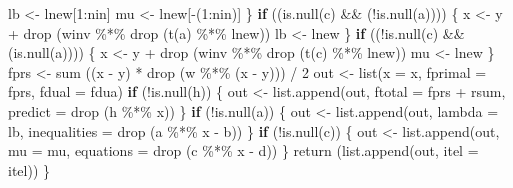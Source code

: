 \documentclass[
  12pt,
]{book}
\newenvironment{Shaded}{\begin{snugshade}}{\end{snugshade}}
\newcommand{\AttributeTok}[1]{\textcolor[rgb]{0.77,0.63,0.00}{#1}}
\newcommand{\ControlFlowTok}[1]{\textcolor[rgb]{0.13,0.29,0.53}{\textbf{#1}}}
\newcommand{\DecValTok}[1]{\textcolor[rgb]{0.00,0.00,0.81}{#1}}
\newcommand{\FunctionTok}[1]{\textcolor[rgb]{0.00,0.00,0.00}{#1}}
\newcommand{\NormalTok}[1]{#1}
\newcommand{\OtherTok}[1]{\textcolor[rgb]{0.56,0.35,0.01}{#1}}
\newcommand{\SpecialCharTok}[1]{\textcolor[rgb]{0.00,0.00,0.00}{#1}}
\theoremstyle{definition}
\theoremstyle{definition}
\theoremstyle{definition}
\theoremstyle{definition}
\theoremstyle{remark}
\begin{document}
\begin{Shaded}
\begin{Highlighting}[]
\NormalTok{      lb }\OtherTok{\textless{}{-}}\NormalTok{ lnew[}\DecValTok{1}\SpecialCharTok{:}\NormalTok{nin]}
\NormalTok{      mu }\OtherTok{\textless{}{-}}\NormalTok{ lnew[}\SpecialCharTok{{-}}\NormalTok{(}\DecValTok{1}\SpecialCharTok{:}\NormalTok{nin)]}
\NormalTok{    \}}
    \ControlFlowTok{if}\NormalTok{ ((}\FunctionTok{is.null}\NormalTok{(c) }\SpecialCharTok{\&\&}\NormalTok{ (}\SpecialCharTok{!}\FunctionTok{is.null}\NormalTok{(a)))) \{}
\NormalTok{      x }\OtherTok{\textless{}{-}}\NormalTok{ y }\SpecialCharTok{+} \FunctionTok{drop}\NormalTok{ (winv }\SpecialCharTok{\%*\%} \FunctionTok{drop}\NormalTok{ (}\FunctionTok{t}\NormalTok{(a) }\SpecialCharTok{\%*\%}\NormalTok{ lnew))}
\NormalTok{      lb }\OtherTok{\textless{}{-}}\NormalTok{ lnew}
\NormalTok{    \}}
    \ControlFlowTok{if}\NormalTok{ ((}\SpecialCharTok{!}\FunctionTok{is.null}\NormalTok{(c) }\SpecialCharTok{\&\&}\NormalTok{ (}\FunctionTok{is.null}\NormalTok{(a)))) \{}
\NormalTok{      x }\OtherTok{\textless{}{-}}\NormalTok{ y }\SpecialCharTok{+} \FunctionTok{drop}\NormalTok{ (winv }\SpecialCharTok{\%*\%} \FunctionTok{drop}\NormalTok{ (}\FunctionTok{t}\NormalTok{(c) }\SpecialCharTok{\%*\%}\NormalTok{ lnew))}
\NormalTok{      mu }\OtherTok{\textless{}{-}}\NormalTok{ lnew}
\NormalTok{    \}}
\NormalTok{    fprs }\OtherTok{\textless{}{-}} \FunctionTok{sum}\NormalTok{ ((x }\SpecialCharTok{{-}}\NormalTok{ y) }\SpecialCharTok{*} \FunctionTok{drop}\NormalTok{ (w }\SpecialCharTok{\%*\%}\NormalTok{ (x }\SpecialCharTok{{-}}\NormalTok{ y))) }\SpecialCharTok{/} \DecValTok{2}
\NormalTok{    out }\OtherTok{\textless{}{-}} \FunctionTok{list}\NormalTok{(}\AttributeTok{x =}\NormalTok{ x,}
                \AttributeTok{fprimal =}\NormalTok{ fprs,}
                \AttributeTok{fdual =}\NormalTok{ fdua)}
    \ControlFlowTok{if}\NormalTok{ (}\SpecialCharTok{!}\FunctionTok{is.null}\NormalTok{(h)) \{}
\NormalTok{      out }\OtherTok{\textless{}{-}}
        \FunctionTok{list.append}\NormalTok{(out, }\AttributeTok{ftotal =}\NormalTok{ fprs }\SpecialCharTok{+}\NormalTok{ rsum, }\AttributeTok{predict =} \FunctionTok{drop}\NormalTok{ (h }\SpecialCharTok{\%*\%}\NormalTok{ x))}
\NormalTok{    \}}
    \ControlFlowTok{if}\NormalTok{ (}\SpecialCharTok{!}\FunctionTok{is.null}\NormalTok{(a)) \{}
\NormalTok{      out }\OtherTok{\textless{}{-}}
        \FunctionTok{list.append}\NormalTok{(out, }\AttributeTok{lambda =}\NormalTok{ lb, }\AttributeTok{inequalities =} \FunctionTok{drop}\NormalTok{ (a }\SpecialCharTok{\%*\%}\NormalTok{ x }\SpecialCharTok{{-}}\NormalTok{ b))}
\NormalTok{    \}}
    \ControlFlowTok{if}\NormalTok{ (}\SpecialCharTok{!}\FunctionTok{is.null}\NormalTok{(c)) \{}
\NormalTok{      out }\OtherTok{\textless{}{-}} \FunctionTok{list.append}\NormalTok{(out, }\AttributeTok{mu =}\NormalTok{ mu, }\AttributeTok{equations =} \FunctionTok{drop}\NormalTok{ (c }\SpecialCharTok{\%*\%}\NormalTok{ x }\SpecialCharTok{{-}}\NormalTok{ d))}
\NormalTok{    \}}
    \FunctionTok{return}\NormalTok{ (}\FunctionTok{list.append}\NormalTok{(out, }\AttributeTok{itel =}\NormalTok{ itel))}
\NormalTok{  \}}



\end{Highlighting}
\end{Shaded}
\end{document}
